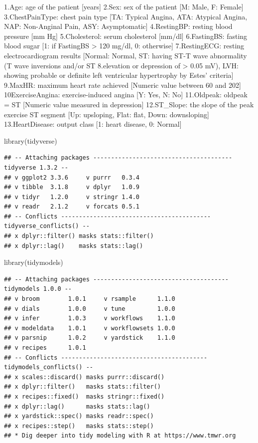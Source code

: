 \documentclass[
]{article}
\newenvironment{Shaded}{\begin{snugshade}}{\end{snugshade}}
\newcommand{\FunctionTok}[1]{\textcolor[rgb]{0.00,0.00,0.00}{#1}}
\newcommand{\NormalTok}[1]{#1}
\begin{document}
1.Age: age of the patient {[}years{]} 2.Sex: sex of the patient {[}M:
Male, F: Female{]} 3.ChestPainType: chest pain type {[}TA: Typical
Angina, ATA: Atypical Angina, NAP: Non-Anginal Pain, ASY:
Asymptomatic{]} 4.RestingBP: resting blood pressure {[}mm Hg{]}
5.Cholesterol: serum cholesterol {[}mm/dl{]} 6.FastingBS: fasting blood
sugar {[}1: if FastingBS \textgreater{} 120 mg/dl, 0: otherwise{]}
7.RestingECG: resting electrocardiogram results {[}Normal: Normal, ST:
having ST-T wave abnormality (T wave inversions and/or ST 8.elevation or
depression of \textgreater{} 0.05 mV), LVH: showing probable or definite
left ventricular hypertrophy by Estes' criteria{]} 9.MaxHR: maximum
heart rate achieved {[}Numeric value between 60 and 202{]}
10ExerciseAngina: exercise-induced angina {[}Y: Yes, N: No{]}
11.Oldpeak: oldpeak = ST {[}Numeric value measured in depression{]}
12.ST\_Slope: the slope of the peak exercise ST segment {[}Up:
upsloping, Flat: flat, Down: downsloping{]} 13.HeartDisease: output
class {[}1: heart disease, 0: Normal{]}

\begin{Shaded}
\begin{Highlighting}[]
\FunctionTok{library}\NormalTok{(tidyverse)}
\end{Highlighting}
\end{Shaded}

\begin{verbatim}
## -- Attaching packages --------------------------------------- tidyverse 1.3.2 --
## v ggplot2 3.3.6     v purrr   0.3.4
## v tibble  3.1.8     v dplyr   1.0.9
## v tidyr   1.2.0     v stringr 1.4.0
## v readr   2.1.2     v forcats 0.5.1
## -- Conflicts ------------------------------------------ tidyverse_conflicts() --
## x dplyr::filter() masks stats::filter()
## x dplyr::lag()    masks stats::lag()
\end{verbatim}

\begin{Shaded}
\begin{Highlighting}[]
\FunctionTok{library}\NormalTok{(tidymodels)}
\end{Highlighting}
\end{Shaded}

\begin{verbatim}
## -- Attaching packages -------------------------------------- tidymodels 1.0.0 --
## v broom        1.0.1     v rsample      1.1.0
## v dials        1.0.0     v tune         1.0.0
## v infer        1.0.3     v workflows    1.1.0
## v modeldata    1.0.1     v workflowsets 1.0.0
## v parsnip      1.0.2     v yardstick    1.1.0
## v recipes      1.0.1     
## -- Conflicts ----------------------------------------- tidymodels_conflicts() --
## x scales::discard() masks purrr::discard()
## x dplyr::filter()   masks stats::filter()
## x recipes::fixed()  masks stringr::fixed()
## x dplyr::lag()      masks stats::lag()
## x yardstick::spec() masks readr::spec()
## x recipes::step()   masks stats::step()
## * Dig deeper into tidy modeling with R at https://www.tmwr.org
\end{verbatim}
\end{document}

